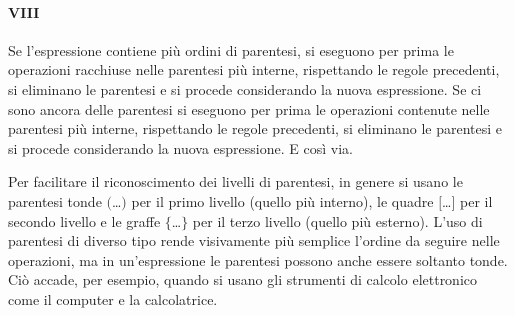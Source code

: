 \paragraph{VIII} Se l'espressione contiene più ordini di parentesi, si eseguono per prima le operazioni racchiuse nelle parentesi più interne, rispettando le regole precedenti, si eliminano le parentesi e si procede considerando la nuova espressione. Se ci sono ancora delle parentesi si eseguono per prima le operazioni contenute nelle parentesi più interne, rispettando le regole precedenti, si eliminano le parentesi e si procede considerando la nuova espressione. E così via.

Per facilitare il riconoscimento dei livelli di parentesi, in genere si usano le parentesi tonde $($\ldots$)$ per il primo livello (quello più interno), le quadre $[$\ldots$]$ per il secondo livello e le graffe $\{$\ldots$\}$ per il terzo livello (quello più esterno).
L'uso di parentesi di diverso tipo rende visivamente più semplice l'ordine da seguire nelle operazioni, ma in
un'espressione le parentesi possono anche essere soltanto tonde. Ciò accade, per esempio, quando si usano gli
strumenti di calcolo elettronico come il computer e la calcolatrice.

\vspazio\ovalbox{\risolvi\ref{ese:1.27}}
\newpage



\cleardoublepage
